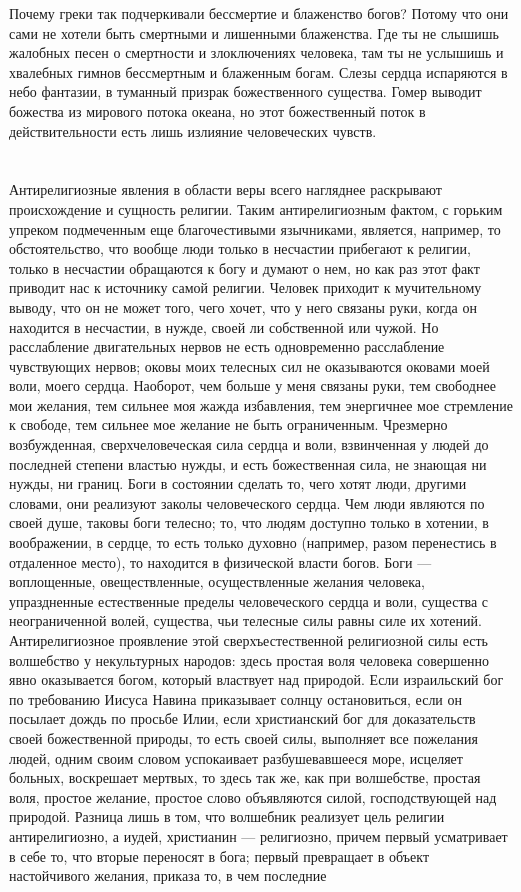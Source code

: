 \documentclass[12pt]{article}
\begin{document}
Почему греки так подчеркивали бессмертие и блаженство богов? Потому что они сами не хотели быть смертными и лишенными блаженства. Где ты не слышишь жалобных песен о смертности и злоключениях человека, там ты не услышишь и хвалебных гимнов бессмертным и блаженным богам. Слезы сердца испаряются в небо фантазии, в туманный призрак божественного существа. Гомер выводит божества из мирового потока океана, но этот божественный поток в действительности есть лишь излияние человеческих чувств.


\section{}

Антирелигиозные явления в области веры всего нагляднее раскрывают происхождение и сущность религии. Таким антирелигиозным фактом, с горьким упреком подмеченным еще благочестивыми язычниками, является, например, то обстоятельство, что вообще люди только в несчастии прибегают к религии, только в несчастии обращаются к богу и думают о нем, но как раз этот факт приводит нас к источнику самой религии. Человек приходит к мучительному выводу, что он не может того, чего хочет, что у него связаны руки, когда он находится в несчастии, в нужде, своей ли собственной или чужой. Но расслабление двигательных нервов не есть одновременно расслабление чувствующих нервов; оковы моих телесных сил не оказываются оковами моей воли, моего сердца. Наоборот, чем больше у меня связаны руки, тем свободнее мои желания, тем сильнее моя жажда избавления, тем энергичнее мое стремление к свободе, тем сильнее мое желание не быть ограниченным. Чрезмерно возбужденная, сверхчеловеческая сила сердца и воли, взвинченная у людей до последней степени властью нужды, и есть божественная сила, не знающая ни нужды, ни границ. Боги в состоянии сделать то, чего хотят люди, другими словами, они реализуют заколы человеческого сердца. Чем люди являются по своей душе, таковы боги телесно; то, что людям доступно только в хотении, в воображении, в сердце, то есть только духовно (например, разом перенестись в отдаленное место), то находится в физической власти богов. Боги --- воплощенные, овеществленные, осуществленные желания человека, упраздненные естественные пределы человеческого сердца и воли, существа с неограниченной волей, существа, чьи телесные силы равны силе их хотений. Антирелигиозное проявление этой сверхъестественной религиозной силы есть волшебство у некультурных народов: здесь простая воля человека совершенно явно оказывается богом, который властвует над природой. Если израильский бог по требованию Иисуса Навина приказывает солнцу остановиться, если он посылает дождь по просьбе Илии, если христианский бог для доказательств своей божественной природы, то есть своей силы, выполняет все пожелания людей, одним своим словом успокаивает разбушевавшееся море, исцеляет больных, воскрешает мертвых, то здесь так же, как при волшебстве, простая воля, простое желание, простое слово объявляются силой, господствующей над природой. Разница лишь в том, что волшебник реализует цель религии антирелигиозно, а иудей, христианин --- религиозно, причем первый усматривает в себе то, что вторые переносят в бога; первый превращает в объект настойчивого желания, приказа то, в чем последние 
\end{document}
